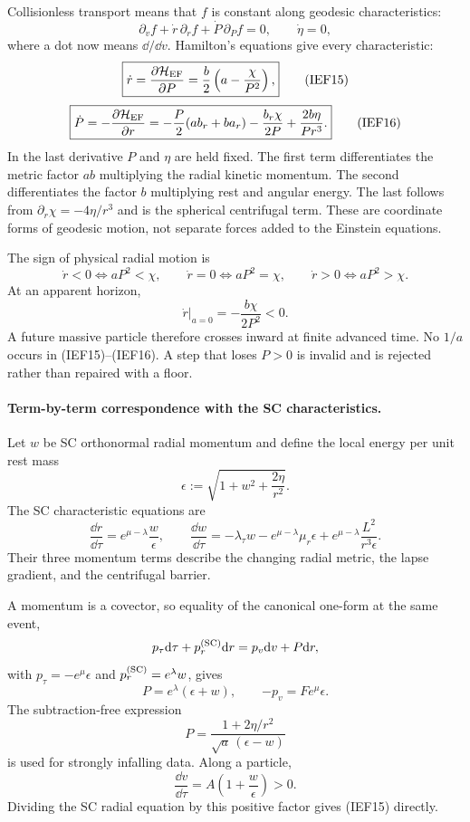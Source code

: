 Collisionless transport means that \(f\) is constant along geodesic
characteristics:
\[
 \partial_v f+\dot r\,\partial_r f+\dot P\,\partial_P f=0,
 \qquad \dot\eta=0,                                      \tag{IEF14}
\]
where a dot now means \(\dd/\dd v\).  Hamilton's equations give every
characteristic:
\[
 \boxed{\dot r=\frac{\partial{\cal H}_{\rm EF}}{\partial P}
 =\frac b2\left(a-\frac{\chi}{P^2}\right),}              \tag{IEF15}
\]
\[
 \boxed{\dot P=-\frac{\partial{\cal H}_{\rm EF}}{\partial r}
 =-\frac P2(ab_r+ba_r)-\frac{b_r\chi}{2P}
   +\frac{2b\eta}{P r^3}.}                               \tag{IEF16}
\]
In the last derivative \(P\) and \(\eta\) are held fixed.  The first term
differentiates the metric factor \(ab\) multiplying the radial kinetic
momentum.  The second differentiates the factor \(b\) multiplying rest and
angular energy.  The last follows from
\(\partial_r\chi=-4\eta/r^3\) and is the spherical centrifugal term.  These
are coordinate forms of geodesic motion, not separate forces added to the
Einstein equations.

The sign of physical radial motion is
\[
 \dot r<0\Longleftrightarrow aP^2<\chi,\qquad
 \dot r=0\Longleftrightarrow aP^2=\chi,\qquad
 \dot r>0\Longleftrightarrow aP^2>\chi.                  \tag{IEF13a}
\]
At an apparent horizon,
\[
 \left.\dot r\right|_{a=0}=-\frac{b\chi}{2P^2}<0.         \tag{IEF17}
\]
A future massive particle therefore crosses inward at finite advanced time.
No \(1/a\) occurs in (IEF15)--(IEF16).  A step that loses \(P>0\) is invalid
and is rejected rather than repaired with a floor.

\paragraph{Term-by-term correspondence with the SC characteristics.}
Let \(w\) be SC orthonormal radial momentum and define the local energy per
unit rest mass
\[
 \epsilon:=\sqrt{1+w^2+\frac{2\eta}{r^2}}.                \tag{IEF41}
\]
The SC characteristic equations are
\[
 \frac{\dd r}{\dd\tau}=e^{\mu-\lambda}\frac{w}{\epsilon},
 \qquad
 \frac{\dd w}{\dd\tau}
 =-\lambda_\tau w-e^{\mu-\lambda}\mu_r\epsilon
  +e^{\mu-\lambda}\frac{L^2}{r^3\epsilon}.               \tag{IEF-SC-V}
\]
Their three momentum terms describe the changing radial metric, the lapse
gradient, and the centrifugal barrier.

A momentum is a covector, so equality of the canonical one-form at the same
event,
\[
 p_\tau\mathrm d\tau+p_r^{({\rm SC})}\mathrm d r=p_v\mathrm d v+P\mathrm d r,
\]
with \(p_\tau=-e^\mu\epsilon\) and
\(p_r^{({\rm SC})}=e^\lambda w\), gives
\[
 \boxed{P=e^\lambda(\epsilon+w)},\qquad
 \boxed{-p_v=F e^\mu\epsilon}.                            \tag{IEF42}
\]
The subtraction-free expression
\[
 P=\frac{1+2\eta/r^2}{\sqrt a\,(\epsilon-w)}              \tag{IEF43}
\]
is used for strongly infalling data.  Along a particle,
\[
 \frac{\dd v}{\dd\tau}
 =A\left(1+\frac{w}{\epsilon}\right)>0.                  \tag{IEF42a}
\]
Dividing the SC radial equation by this positive factor gives (IEF15)
directly.

